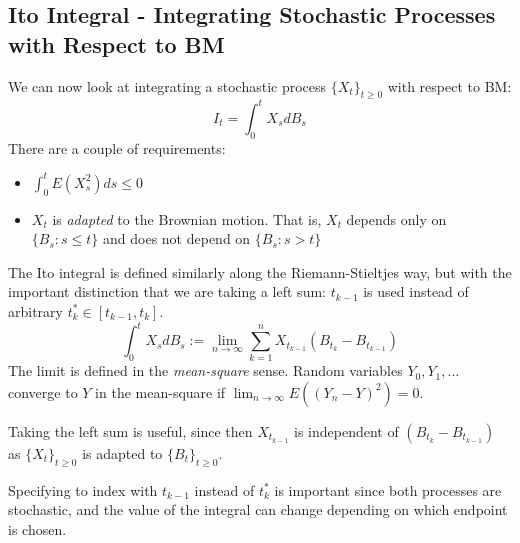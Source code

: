 \documentclass{article}
\begin{document}
\subsection{Ito Integral - Integrating Stochastic Processes with Respect to BM}
We can now look at integrating a stochastic process $\{X_t\}_{t\geq 0}$ with respect to BM:
$$I_t = \int_0^t X_s dB_s$$
There are a couple of requirements: 
\begin{itemize}
\item $\int_0^t E(X_s^2)ds \leq 0$
\item $X_t$ is \emph{adapted} to the Brownian motion.  That is, $X_t$ depends only on $\{B_s: s\leq t\}$ and does not depend on $\{B_s: s > t\}$
\end{itemize}

The Ito integral is defined similarly along the Riemann-Stieltjes way, but with the important distinction that we are taking a left sum: $t_{k-1}$ is used instead of arbitrary $t_k^* \in [t_{k-1},t_k]$.  
$$\int_0^t X_s dB_s := \lim_{n\to\infty} \sum_{k=1}^n X_{t_{k-1}}(B_{t_k} - B_{t_{k-1}})$$
The limit is defined in the \emph{mean-square} sense.  Random variables $Y_0,Y_1,\ldots$ converge to $Y$ in the mean-square if $\lim_{n\to\infty} E((Y_n-Y)^2) = 0$.

Taking the left sum is useful, since then $X_{t_{k-1}}$ is independent of $(B_{t_k} - B_{t_{k-1}})$ as $\{X_t\}_{t\geq0}$ is adapted to $\{B_t\}_{t\geq0}$.

Specifying to index with $t_{k-1}$ instead of $t_k^*$ is important since both processes are stochastic, and the value of the integral can change depending on which endpoint is chosen.
\end{document}
